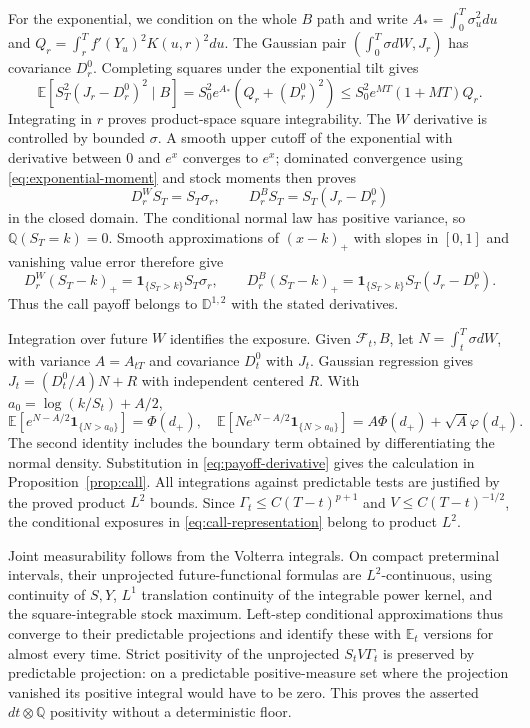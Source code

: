 \documentclass[11pt,a4paper]{amsart}
\theoremstyle{plain}
\theoremstyle{definition}
\theoremstyle{remark}
\newcommand{\EE}{\mathbb{E}}
\newcommand{\QQ}{\mathbb{Q}}
\newcommand{\F}{\mathcal F}
\newcommand{\ph}{\varphi}
\begin{document}
For the exponential, we condition on the whole $B$ path and write
$A_*=\int_0^T\sigma_u^2du$ and $Q_r=\int_r^Tf'(Y_u)^2K(u,r)^2du$. The Gaussian pair $(\int_0^T\sigma dW,J_r)$ has covariance $D_r^0$. Completing squares under the exponential tilt gives
\begin{equation}\label{eq:exponential-moment}
 \EE[S_T^2(J_r-D_r^0)^2\mid B]
 =S_0^2e^{A_*}(Q_r+(D_r^0)^2)
 \le S_0^2e^{MT}(1+MT)Q_r.
\end{equation}
Integrating in $r$ proves product-space square integrability. The $W$ derivative is controlled by bounded $\sigma$. A smooth upper cutoff of the exponential with derivative between $0$ and $e^x$ converges to $e^x$; dominated convergence using \eqref{eq:exponential-moment} and stock moments then proves
\[
 D_r^WS_T=S_T\sigma_r,\qquad
 D_r^BS_T=S_T(J_r-D_r^0)
\]
in the closed domain. The conditional normal law has positive variance, so $\QQ(S_T=k)=0$. Smooth approximations of $(x-k)_+$ with slopes in $[0,1]$ and vanishing value error therefore give
\begin{equation}\label{eq:payoff-derivative}
 D_r^W(S_T-k)_+=\mathbf1_{\{S_T>k\}}S_T\sigma_r,
 \qquad
 D_r^B(S_T-k)_+=\mathbf1_{\{S_T>k\}}S_T(J_r-D_r^0).
\end{equation}
Thus the call payoff belongs to $\mathbb D^{1,2}$ with the stated derivatives.

Integration over future $W$ identifies the exposure. Given $\F_t,B$, let $N=\int_t^T\sigma dW$, with variance $A=A_{tT}$ and covariance $D_t^0$ with $J_t$. Gaussian regression gives $J_t=(D_t^0/A)N+R$ with independent centered $R$. With $a_0=\log(k/S_t)+A/2$,
\[
 \EE[e^{N-A/2}\mathbf1_{\{N>a_0\}}]=\Phi(d_+),
 \quad
 \EE[Ne^{N-A/2}\mathbf1_{\{N>a_0\}}]
      =A\Phi(d_+)+\sqrt A\ph(d_+).
\]
The second identity includes the boundary term obtained by differentiating the normal density. Substitution in \eqref{eq:payoff-derivative} gives the calculation in Proposition~\ref{prop:call}. All integrations against predictable tests are justified by the proved product $L^2$ bounds. Since $\Gamma_t\le C(T-t)^{p+1}$ and $V\le C(T-t)^{-1/2}$, the conditional exposures in \eqref{eq:call-representation} belong to product $L^2$.

Joint measurability follows from the Volterra integrals. On compact preterminal intervals, their unprojected future-functional formulas are $L^2$-continuous, using continuity of $S,Y$, $L^1$ translation continuity of the integrable power kernel, and the square-integrable stock maximum. Left-step conditional approximations thus converge to their predictable projections and identify these with $\EE_t$ versions for almost every time. Strict positivity of the unprojected $S_tV\Gamma_t$ is preserved by predictable projection: on a predictable positive-measure set where the projection vanished its positive integral would have to be zero. This proves the asserted $dt\otimes\QQ$ positivity without a deterministic floor.
\end{document}
